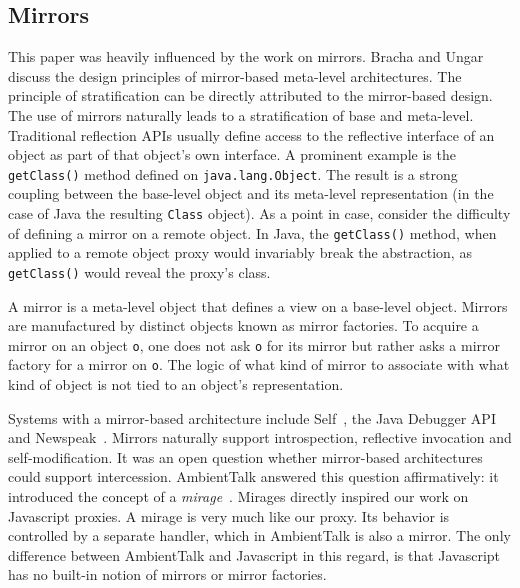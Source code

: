 \documentclass{acm_proc_article-sp}
\begin{document}

\subsection{Mirrors}

This paper was heavily influenced by the work on mirrors. Bracha and Ungar~\cite{bracha_04_mirrors_oopsla} discuss the design principles of mirror-based meta-level architectures. The principle of stratification can be directly attributed to the mirror-based design. The use of mirrors naturally leads to a stratification of base and meta-level. Traditional reflection APIs usually define access to the reflective interface of an object as part of that object's own interface. A prominent example is the \texttt{getClass()} method defined on \texttt{java.lang.Object}. The result is a strong coupling between the base-level object and its meta-level representation (in the case of Java the resulting \texttt{Class} object). As a point in case, consider the difficulty of defining a mirror on a remote object. In Java, the \texttt{getClass()} method, when applied to a remote object proxy would invariably break the abstraction, as \texttt{getClass()} would reveal the proxy's class.

A mirror is a meta-level object that defines a view on a base-level object. Mirrors are manufactured by distinct objects known as mirror factories. To acquire a mirror on an object \texttt{o}, one does not ask \texttt{o} for its mirror but rather asks a mirror factory for a mirror on \texttt{o}. The logic of what kind of mirror to associate with what kind of object is not tied to an object's representation.

Systems with a mirror-based architecture include Self~\cite{ungar87power}, the Java Debugger API~\cite{jdi} and Newspeak~\cite{newspeak}. Mirrors naturally support introspection, reflective invocation and self-modification. It was an open question whether mirror-based architectures could support intercession. AmbientTalk answered this question affirmatively: it introduced the concept of a \emph{mirage}~\cite{mirages_dls_07,spe_journal_08}. Mirages directly inspired our work on Javascript proxies. A mirage is very much like our proxy. Its behavior is controlled by a separate handler, which in AmbientTalk is also a mirror. The only difference between AmbientTalk and Javascript in this regard, is that Javascript has no built-in notion of mirrors or mirror factories.
\end{document}
